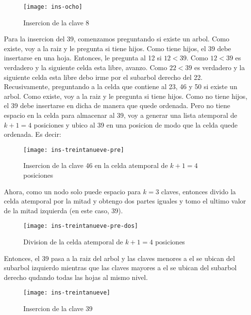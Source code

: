 \documentclass[10pt,a4paper]{article}
\begin{document}
\begin{figure}[h]
\centering
\texttt{[image: ins-ocho]}
\caption{Insercion de la clave 8}
\label{drivers1}
\end{figure}

Para la insercion del 39, comenzamos preguntando si existe un arbol. Como existe, voy a la raiz y le pregunta si tiene hijos. Como tiene hijos, el 39 debe insertarse en una hoja. Entonces, le pregunta al 12 si $12 < 39$.
\newline
\newline
Como $12 < 39$ es verdadero y la siguiente celda esta libre, avanzo. Como $22 < 39$ es verdadero y la siguiente celda esta libre debo irme por el subarbol derecho del 22. Recusivamente, preguntando a la celda que contiene al 23, 46 y 50 si existe un arbol. Como existe, voy a la raiz y le pregunta si tiene hijos. Como no tiene hijos, el 39 debe insertarse en dicha de manera que quede ordenada. Pero no tiene espacio en la celda para almacenar al 39, voy a generar una lista atemporal de $k+1 = 4$ posiciones y ubico al 39 en una posicion de modo que la celda quede ordenada. Es decir:

\begin{figure}[h]
\centering
\texttt{[image: ins-treintanueve-pre]}
\caption{Insercion de la clave 46 en la celda atemporal de $k+1 = 4$ posiciones}
\label{drivers1}
\end{figure}

Ahora, como un nodo solo puede espacio para $k = 3$ claves, entonces divido la celda atemporal por la mitad y obtengo dos partes iguales y tomo el ultimo valor de la mitad izquierda (en este caso, 39).

\begin{figure}[h]
\centering
\texttt{[image: ins-treintanueve-pre-dos]}
\caption{Division de la celda atemporal de $k+1 = 4$ posiciones}
\label{drivers1}
\end{figure}
\newpage

Entonces, el 39 pasa a la raiz del arbol y las claves menores a el se ubican del subarbol izquierdo mientras que las claves mayores a el se ubican del subarbol derecho qudando todas las hojas al mismo nivel.

\begin{figure}[h]
\centering
\texttt{[image: ins-treintanueve]}
\caption{Insercion de la clave 39}
\label{drivers1}
\end{figure}
\end{document}

